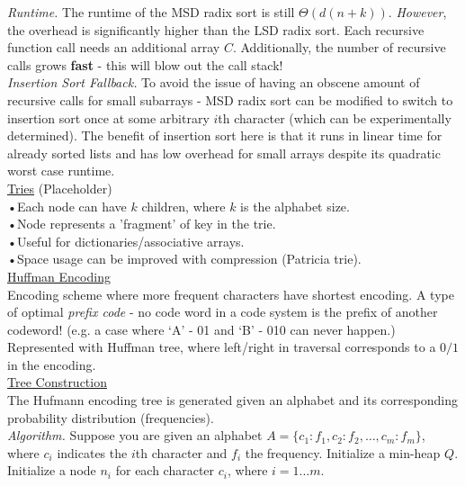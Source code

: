 \documentclass[12pt, fleqn]{general}
\begin{document}
\begin{multicols*}{2}
    \emph{Runtime.} The runtime of the MSD radix sort is still $\Theta(d(n+k))$. \emph{However}, the overhead is significantly higher than the LSD radix sort. Each recursive function call needs an additional array $C$. Additionally, the number of recursive calls grows \textbf{fast} - this will blow out the call stack!\\

    \emph{Insertion Sort Fallback.} To avoid the issue of having an obscene amount of recursive calls for small subarrays - MSD radix sort can be modified to switch to insertion sort once at some arbitrary $i$th character (which can be experimentally determined). The benefit of insertion sort here is that it runs in linear time for already sorted lists and has low overhead for small arrays despite its quadratic worst case runtime.\\
    

    {\large \underline{Tries} (Placeholder)}\\

    •Each node can have $k$ children, where $k$ is the alphabet size.\\
    •Node represents a 'fragment' of key in the trie.\\
    •Useful for dictionaries/associative arrays.\\
    •Space usage can be improved with compression (Patricia trie).\\

    {\large \underline{Huffman Encoding}}\\

    Encoding scheme where more frequent characters have shortest encoding. A type of optimal \emph{prefix code} - no code word in a code system is the prefix of another codeword! (e.g. a case where `A' - 01 and `B' - 010 can never happen.)\\

    Represented with Huffman tree, where left/right in traversal corresponds to a $0/1$ in the encoding.\\

    \underline{Tree Construction}\\
    
    The Hufmann encoding tree is generated given an alphabet and its corresponding probability distribution (frequencies).\\

    \emph{Algorithm.} Suppose you are given an alphabet $A = \{c_1 : f_1, c_2 : f_2, \dots, c_m : f_m\}$, where $c_i$ indicates the $i$th character and $f_i$ the frequency. Initialize a min-heap $Q$. Initialize a node $n_i$ for each character $c_i$, where $i = 1\dots m$.\\
    

\end{multicols*}
\end{document}
